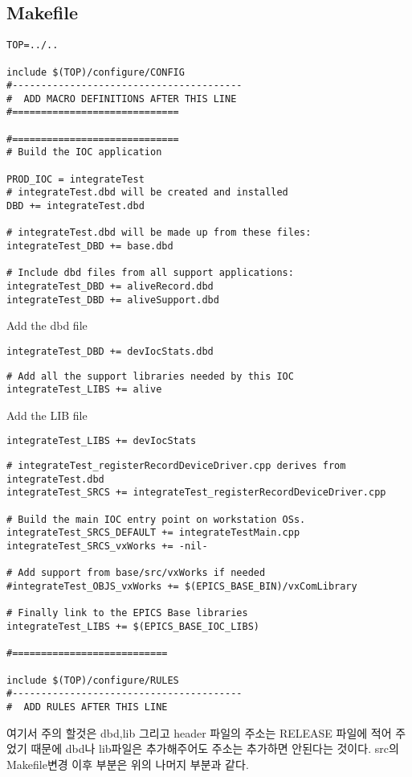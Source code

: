 \documentclass[11pt
  , a4paper
  , article
  , oneside
]{memoir}
\begin{document}
\subsection{Makefile}
\begin{lstlisting}[style=termstyle]
TOP=../..

include $(TOP)/configure/CONFIG
#----------------------------------------
#  ADD MACRO DEFINITIONS AFTER THIS LINE
#=============================

#=============================
# Build the IOC application

PROD_IOC = integrateTest
# integrateTest.dbd will be created and installed
DBD += integrateTest.dbd

# integrateTest.dbd will be made up from these files:
integrateTest_DBD += base.dbd

# Include dbd files from all support applications:
integrateTest_DBD += aliveRecord.dbd
integrateTest_DBD += aliveSupport.dbd
\end{lstlisting}
Add the dbd file
\begin{lstlisting}[style=termstyle]
integrateTest_DBD += devIocStats.dbd
\end{lstlisting}
\begin{lstlisting}[style=termstyle]
# Add all the support libraries needed by this IOC
integrateTest_LIBS += alive
\end{lstlisting}
Add the LIB file
\begin{lstlisting}[style=termstyle]
integrateTest_LIBS += devIocStats
\end{lstlisting}
\begin{lstlisting}[style=termstyle]
# integrateTest_registerRecordDeviceDriver.cpp derives from integrateTest.dbd
integrateTest_SRCS += integrateTest_registerRecordDeviceDriver.cpp

# Build the main IOC entry point on workstation OSs.
integrateTest_SRCS_DEFAULT += integrateTestMain.cpp
integrateTest_SRCS_vxWorks += -nil-

# Add support from base/src/vxWorks if needed
#integrateTest_OBJS_vxWorks += $(EPICS_BASE_BIN)/vxComLibrary

# Finally link to the EPICS Base libraries
integrateTest_LIBS += $(EPICS_BASE_IOC_LIBS)

#===========================

include $(TOP)/configure/RULES
#----------------------------------------
#  ADD RULES AFTER THIS LINE
\end{lstlisting}
여기서 주의 할것은 dbd,lib 그리고 header 파일의 주소는 RELEASE 파일에 적어 주었기 때문에 dbd나 lib파일은 추가해주어도 주소는 추가하면 안된다는 것이다.
src의 Makefile변경 이후 부분은 위의 나머지 부분과 같다.
\clearpage
\end{document}
